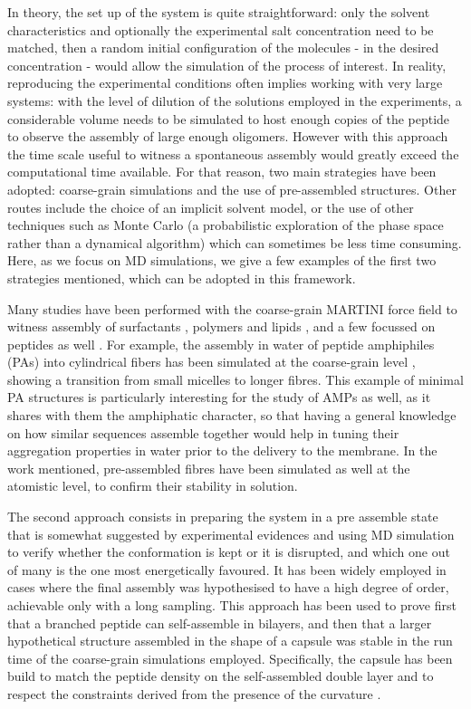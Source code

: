 In theory, the set up of the system is quite straightforward: only the solvent characteristics and optionally the experimental salt concentration need to be matched, then a random initial configuration of the molecules - in the desired concentration - would allow the simulation of the process of interest.
%
In reality, reproducing the experimental conditions often implies working with very large systems: with the level of dilution of the solutions employed in the experiments, a considerable volume needs to be simulated to host enough copies of the peptide to observe the assembly of large enough oligomers.
%
However with this approach the time scale useful to witness a spontaneous assembly would greatly exceed the computational time available. For that reason, two main strategies have been adopted: coarse-grain simulations and the use of pre-assembled structures. Other routes include the choice of an implicit solvent model, or the use of other techniques such as Monte Carlo (a probabilistic exploration of the phase space rather than a dynamical algorithm) which can sometimes be less time consuming. Here, as we focus on MD simulations, we give a few examples of the first two strategies mentioned, which can be adopted in this framework.

Many studies have been performed with the coarse-grain MARTINI force field to witness assembly of surfactants \cite{Wu2012}, polymers \cite{Wang2012poly,Bochicchio2017} and lipids \cite{Lee2011,Brocos2012}, and a few focussed on peptides as well \cite{Guo2012,Seo2012}.
%
For example, the assembly in water of peptide amphiphiles (PAs) into cylindrical fibers has been simulated at the coarse-grain level \cite{Lee2012}, showing a transition from small micelles to longer fibres. This example of minimal PA structures is particularly interesting for the study of AMPs as well, as it shares with them the amphiphatic character, so that having a general knowledge on how similar sequences assemble together would help in tuning their aggregation properties in water prior to the delivery to the membrane.
%
In the work mentioned, pre-assembled fibres have been simulated as well at the atomistic level, to confirm their stability in solution.

The second approach consists in preparing the system in a pre assemble state that is somewhat suggested by experimental evidences and using MD simulation to verify whether the conformation is kept or it is disrupted, and which one out of many is the one most energetically favoured. It has been widely employed in cases where the final assembly was hypothesised to have a high degree of order, achievable only with a long sampling. 
%
This approach has been used to prove first that a branched peptide can self-assemble in bilayers, and then that a larger hypothetical structure assembled in the shape of a capsule was stable in the run time of the coarse-grain simulations employed. Specifically, the capsule has been build to match the peptide density on the self-assembled double layer and to respect the constraints derived from the presence of the curvature \cite{Gudlur2012}.

